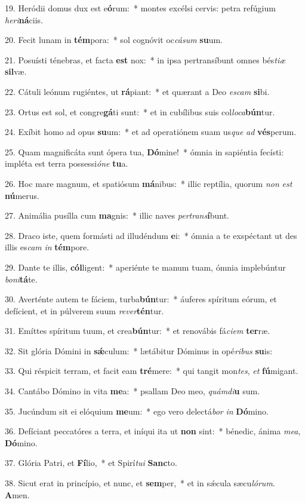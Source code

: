 19. Heródii domus dux est e\textbf{ó}rum:~*  montes excélsi cervis: petra refúgium \textit{he}\textit{ri}\textbf{ná}ciis.\

20. Fecit lunam in \textbf{tém}pora:~*  sol cognóvit oc\textit{cá}\textit{sum} \textbf{su}um.\

21. Posuísti ténebras, et facta \textbf{est} nox:~*  in ipsa pertransíbunt omnes bés\textit{ti}\textit{æ} \textbf{sil}væ.\

22. Cátuli leónum rugiéntes, ut \textbf{rá}piant:~*  et quærant a Deo \textit{es}\textit{cam} \textbf{si}bi.\

23. Ortus est sol, et congre\textbf{gá}ti sunt:~*  et in cubílibus suis col\textit{lo}\textit{ca}\textbf{bún}tur.\

24. Exíbit homo ad opus \textbf{su}um:~*  et ad operatiónem suam us\textit{que} \textit{ad} \textbf{vés}perum.\

25. Quam magnificáta sunt ópera tua, \textbf{Dó}mine!~*  ómnia in sapiéntia fecísti: impléta est terra possessi\textit{ó}\textit{ne} \textbf{tu}a.\

26. Hoc mare magnum, et spatiósum \textbf{má}nibus:~*  illic reptília, quorum \textit{non} \textit{est} \textbf{nú}merus.\

27. Animália pusílla cum \textbf{ma}gnis:~*  illic naves \textit{per}\textit{trans}\textbf{í}bunt.\

28. Draco iste, quem formásti ad illudéndum \textbf{e}i:~*  ómnia a te exspéctant ut des illis es\textit{cam} \textit{in} \textbf{tém}pore.\

29. Dante te illis, \textbf{cól}ligent:~*  aperiénte te manum tuam, ómnia implebúntur \textit{bo}\textit{ni}\textbf{tá}te.\

30. Averténte autem te fáciem, turba\textbf{bún}tur:~*  áuferes spíritum eórum, et defícient, et in púlverem suum \textit{re}\textit{ver}\textbf{tén}tur.\

31. Emíttes spíritum tuum, et crea\textbf{bún}tur:~*  et renovábis fá\textit{ci}\textit{em} \textbf{ter}ræ.\

32. Sit glória Dómini in \textbf{sǽ}culum:~*  lætábitur Dóminus in opé\textit{ri}\textit{bus} \textbf{su}is:\

33. Qui réspicit terram, et facit eam \textbf{tré}mere:~*  qui tangit mon\textit{tes}, \textit{et} \textbf{fú}migant.\

34. Cantábo Dómino in vita \textbf{me}a:~*  psallam Deo meo, \textit{quám}\textit{di}\textbf{u} sum.\

35. Jucúndum sit ei elóquium \textbf{me}um:~*  ego vero delectá\textit{bor} \textit{in} \textbf{Dó}mino.\

36. Defíciant peccatóres a terra, et iníqui ita ut \textbf{non} sint:~*  bénedic, ánima \textit{me}\textit{a}, \textbf{Dó}mino.\

37. Glória Patri, et \textbf{Fí}lio,~*  et Spirí\textit{tu}\textit{i} \textbf{Sanc}to.\

38. Sicut erat in princípio, et nunc, et \textbf{sem}per,~*  et in sǽcula sæcu\textit{ló}\textit{rum}. \textbf{A}men.\


